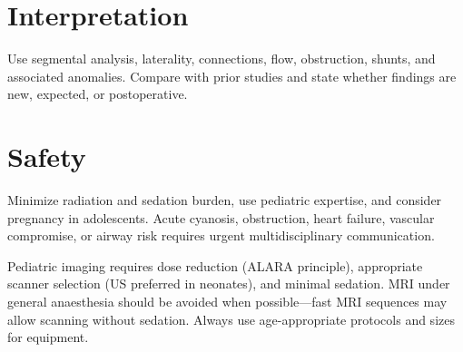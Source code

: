 \section{Interpretation}
Use segmental analysis, laterality, connections, flow, obstruction, shunts, and associated anomalies. Compare with prior studies and state whether findings are new, expected, or postoperative.

\section{Safety}
Minimize radiation and sedation burden, use pediatric expertise, and consider pregnancy in adolescents. Acute cyanosis, obstruction, heart failure, vascular compromise, or airway risk requires urgent multidisciplinary communication.

\begin{pearlbox}
Pediatric imaging requires dose reduction (ALARA principle), appropriate scanner selection (US preferred in neonates), and minimal sedation. MRI under general anaesthesia should be avoided when possible---fast MRI sequences may allow scanning without sedation. Always use age-appropriate protocols and sizes for equipment.
\end{pearlbox}

\clearpage
